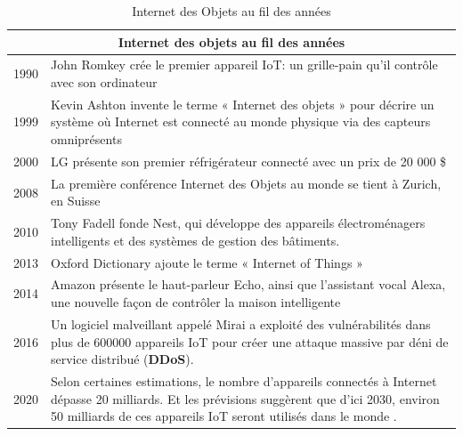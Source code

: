 \begin{table}[H]
	\begin{center}
	\begin{tabular}{|p{3cm}|p{8cm}|}
	\hline 
	\multicolumn{2}{|c|}{\textbf{Internet des objets au f{\kern0pt}il des années}} \\ 
	\hline 
	1990 & John Romkey crée le premier appareil IoT: un grille-pain qu'il contrôle avec son ordinateur \\ 
	\hline 
	1999 & Kevin Ashton invente le terme « Internet des objets » pour décrire un système où Internet est connecté au monde physique via des capteurs omniprésents \\ 
	\hline 
	2000 & LG présente son premier réfrigérateur connecté avec un prix de 20 000 \$ \\ 
	\hline 
	2008 & La première conférence Internet des Objets au monde se tient à Zurich, en Suisse \\ 
	\hline 
	2010 & Tony Fadell fonde Nest, qui développe des appareils électroménagers intelligents et des systèmes de gestion des bâtiments. \\ 
	\hline 
	2013 & Oxford Dictionary ajoute le terme « Internet of Things » \\ 
	\hline 
	2014 & Amazon présente le haut-parleur Echo, ainsi que l'assistant vocal Alexa, une nouvelle façon de contrôler la maison intelligente \\ 
	\hline 
	2016 & Un logiciel malveillant appelé Mirai a exploité des vulnérabilités dans plus de 600000 appareils IoT pour créer une attaque massive par déni de service distribué (\textbf{DDoS}). \\ 
	\hline 
	2020 & Selon certaines estimations, le nombre d'appareils connectés à Internet dépasse 20 milliards. Et les prévisions suggèrent que d'ici 2030, environ 50 milliards de ces appareils IoT seront utilisés dans le monde \cite{statista2020iot}.
	 \\ 
	\hline 
	\end{tabular} 
	\end{center}
	\caption{Internet des Objets au f{\kern0pt}il des années}
\end{table}

